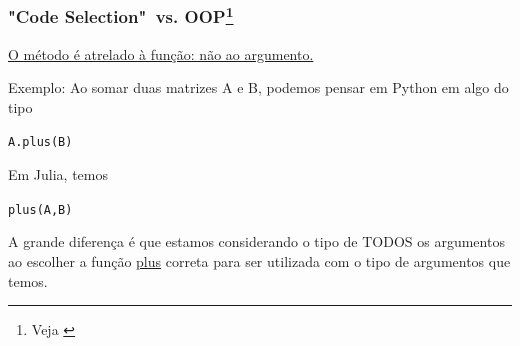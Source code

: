 \documentclass{beamer}
\begin{document}
\begin{frame}
	\frametitle{"Code Selection"\ vs. OOP\footnote{Veja \cite{juliapaper}}}
	\begin{center}
		\underline{O método é atrelado à função: não ao argumento.}
    \end{center}
    Exemplo: Ao somar duas matrizes A e B, podemos pensar em Python em algo do tipo
    \begin{center}
		 \texttt{A.plus(B)}
    \end{center}
    Em Julia, temos
    \begin{center}
    	\texttt{plus(A,B)}
    \end{center}
    A grande diferença é que estamos considerando o tipo de TODOS os argumentos ao escolher a função \underline{plus} correta para ser utilizada com o tipo de argumentos que temos.
\end{frame}
\end{document}
